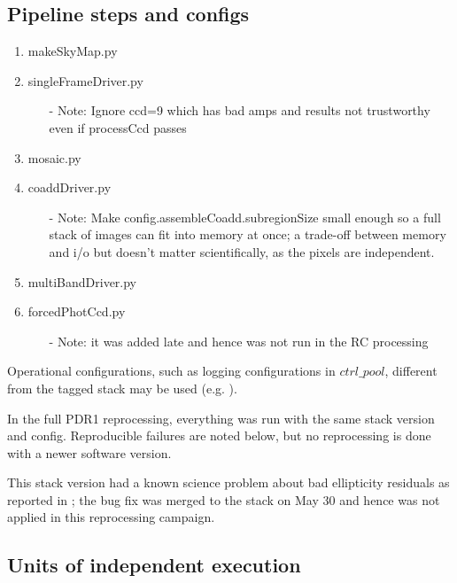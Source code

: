 \documentclass[DM,authoryear,toc]{lsstdoc}
\begin{document}
\subsection{Pipeline steps and configs}
\begin{enumerate}
\item
makeSkyMap.py
\item
singleFrameDriver.py
\begin{enumerate}
\item [-]
Note: Ignore ccd=9 which has bad amps and results not trustworthy even if processCcd passes
\end{enumerate}
\item
mosaic.py
\item
coaddDriver.py
\begin{enumerate}
\item [-]
Note: Make config.assembleCoadd.subregionSize small enough so a full stack of images can fit into memory at once; a trade-off between memory and i/o but doesn't matter scientifically, as the pixels are independent.
\end{enumerate}
\item
multiBandDriver.py
\item
forcedPhotCcd.py
\begin{enumerate}
\item [-]
Note: it was added late and hence was not run in the RC processing
\end{enumerate}
\end{enumerate}

Operational configurations, such as logging configurations in $ctrl{\_}pool$, different from the tagged stack may be used (e.g. ).

In the full PDR1 reprocessing, everything was run with the same stack version and config. Reproducible failures are noted below, but no reprocessing is done with a newer software version.

This stack version had a known science problem about bad ellipticity residuals as reported in ; the bug fix  was merged to the stack on May 30 and hence was not applied in this reprocessing campaign.

\subsection{Units of independent execution}
\end{document}
